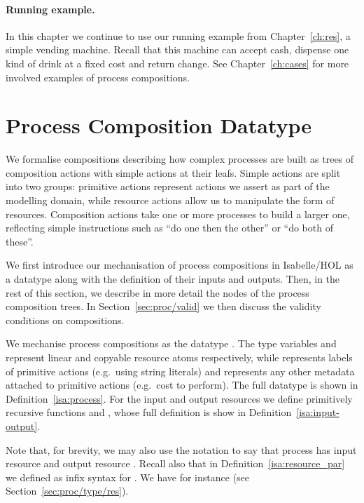 \documentclass[class=smolathesis,crop=false]{standalone}
\begin{document}
\paragraph*{Running example.}
In this chapter we continue to use our running example from Chapter~\ref{ch:res}, a simple vending machine.
Recall that this machine can accept cash, dispense one kind of drink at a fixed cost and return change.
See Chapter~\ref{ch:cases} for more involved examples of process compositions.

\section{Process Composition Datatype}
\label{sec:proc/type}

We formalise compositions describing how complex processes are built as trees of composition actions with simple actions at their leafs.
Simple actions are split into two groups: primitive actions represent actions we assert as part of the modelling domain, while resource actions allow us to manipulate the form of resources.
Composition actions take one or more processes to build a larger one, reflecting simple instructions such as ``do one then the other'' or ``do both of these''.

We first introduce our mechanisation of process compositions in Isabelle/HOL as a datatype along with the definition of their inputs and outputs.
Then, in the rest of this section, we describe in more detail the nodes of the process composition trees.
In Section~\ref{sec:proc/valid} we then discuss the validity conditions on compositions.

We mechanise process compositions as the datatype .
The type variables  and  represent linear and copyable resource atoms respectively, while  represents labels of primitive actions (e.g.\ using string literals) and  represents any other metadata attached to primitive actions (e.g.\ cost to perform).
The full datatype is shown in Definition~\ref{isa:process}.
For the input and output resources we define primitively recursive functions  and , whose full definition is show in Definition~\ref{isa:input-output}.

Note that, for brevity, we may also use the notation  to say that process  has input resource  and output resource .
Recall also that in Definition~\ref{isa:resource_par} we defined  as infix syntax for .
We have for instance  (see Section~\ref{sec:proc/type/res}).
\end{document}

